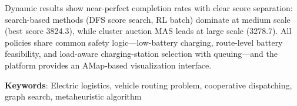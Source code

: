 \documentclass[12pt,a4paper,oneside]{book}
\begin{document}
Dynamic results show near-perfect completion rates with clear score separation: search-based methods (DFS score search, RL batch) dominate at medium scale (best score 3824.3), while cluster auction MAS leads at large scale (3278.7). All policies share common safety logic---low-battery charging, route-level battery feasibility, and load-aware charging-station selection with queuing---and the platform provides an AMap-based visualization interface.

\noindent\textbf{Keywords}: Electric logistics, vehicle routing problem, cooperative dispatching, graph search, metaheuristic algorithm

\tableofcontents

\listoffigures
\listoftables







\end{document}

